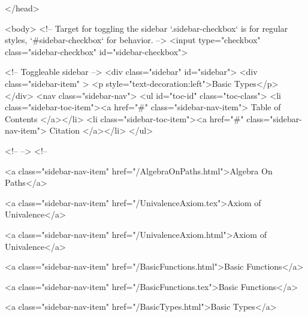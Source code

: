   
</head>




  <body>
    <!-- Target for toggling the sidebar `.sidebar-checkbox` is for regular
     styles, `#sidebar-checkbox` for behavior. -->
<input type="checkbox" class="sidebar-checkbox" id="sidebar-checkbox">

<!-- Toggleable sidebar -->
<div class="sidebar" id="sidebar">
  <div class="sidebar-item" >
    <p style="text-decoration:left">Basic Types</p>
  </div>
  <nav class="sidebar-nav">
    <ul id="toc-id" class="toc-class">
  <li class="sidebar-toc-item"><a href="#" class="sidebar-nav-item"> Table of Contents </a></li>
  <li class="sidebar-toc-item"><a href="#" class="sidebar-nav-item"> Citation </a></li>
</ul>


    <!--  -->
    <!-- 
      
    
      
    
      
    
      
        
      
    
      
        
          <a class="sidebar-nav-item" href="/AlgebraOnPaths.html">Algebra On Paths</a>
        
      
    
      
        
          <a class="sidebar-nav-item" href="/UnivalenceAxiom.tex">Axiom of Univalence</a>
        
      
    
      
        
          <a class="sidebar-nav-item" href="/UnivalenceAxiom.html">Axiom of Univalence</a>
        
      
    
      
        
          <a class="sidebar-nav-item" href="/BasicFunctions.html">Basic Functions</a>
        
      
    
      
        
          <a class="sidebar-nav-item" href="/BasicFunctions.tex">Basic Functions</a>
        
      
    
      
        
          <a class="sidebar-nav-item" href="/BasicTypes.html">Basic Types</a>
        
      
    
      
        
